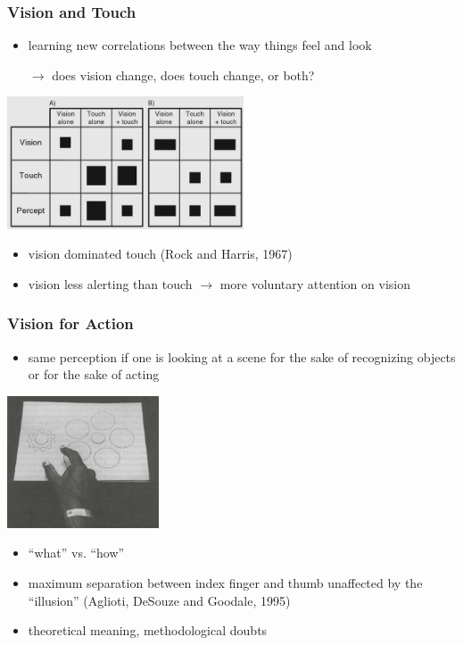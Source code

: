 \documentclass[]{beamer}
\begin{document}
\begin{frame}
 \frametitle{Vision and Touch}
\begin{overlayarea}{120mm}{90mm}
\begin{itemize}
 \item learning new correlations between the way things feel and look 
 \item[$\rightarrow$] does vision change, does touch change, or both?
\end{itemize}

\begin{center}
\includegraphics[width=70mm]{figs/l9/rock_harris_67.png}
\end{center}
\begin{itemize}
 \item<2-> vision dominated touch (Rock and Harris, 1967)
 \item<3-> vision less alerting than touch $\rightarrow$ more voluntary attention on vision
\end{itemize}

\end{overlayarea}
\end{frame}


\begin{frame}
 \frametitle{Vision for Action}
\begin{overlayarea}{120mm}{90mm}
 \begin{itemize}
 \item same perception if one is looking at a scene for the sake of recognizing objects or for the sake of acting
 \end{itemize}

\begin{center}
\includegraphics[width=45mm]{figs/l9/reaching_ebbinghaus.png}
\end{center}
\begin{itemize}
 \item<2-> ``what'' vs. ``how''
 \item<2-> maximum separation between index finger and thumb unaffected by the ``illusion'' (Aglioti, DeSouze and Goodale, 1995)
 \item<3-> theoretical meaning, methodological doubts
\end{itemize}

\end{overlayarea}
\end{frame}
\end{document}
